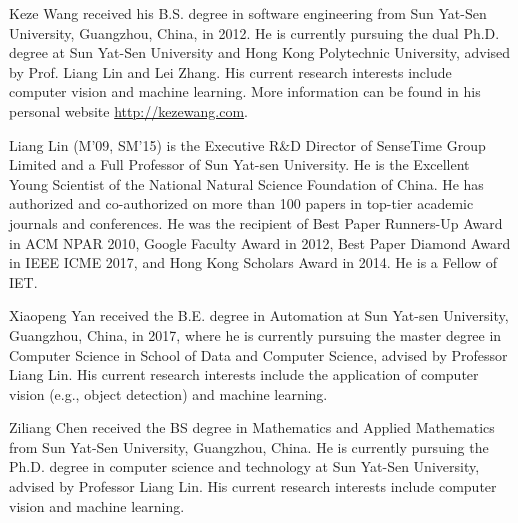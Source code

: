 \documentclass[journal]{IEEEtran}
\begin{document}
{\begin{IEEEbiography}{Keze Wang} received his B.S. degree in software engineering from Sun Yat-Sen University, Guangzhou, China, in 2012. He is currently pursuing the dual Ph.D. degree at Sun Yat-Sen University and Hong Kong Polytechnic University, advised by Prof. Liang Lin and Lei Zhang. His current research interests include computer vision and machine learning. More information can be found in his personal website \url{http://kezewang.com}.
\end{IEEEbiography}

\begin{IEEEbiography}{Liang Lin} (M’09, SM’15) is the Executive R\&D Director of SenseTime Group Limited and a Full Professor of Sun Yat-sen University. He is the Excellent Young Scientist of the National Natural Science Foundation of China. He has authorized and co-authorized on more than 100 papers in top-tier academic journals and conferences. He was the recipient of Best Paper Runners-Up Award in ACM NPAR 2010, Google Faculty Award in 2012, Best Paper Diamond Award in IEEE ICME 2017, and Hong Kong Scholars Award in 2014. He is a Fellow of IET.
\end{IEEEbiography}

\begin{IEEEbiography}{Xiaopeng Yan} received the B.E. degree in Automation at Sun Yat-sen University, Guangzhou, China, in 2017, where he is currently pursuing the master degree  in Computer Science in School of Data and Computer Science, advised by Professor Liang Lin. His current research interests include the application of computer vision (e.g., object detection) and machine learning. 
\end{IEEEbiography}


\begin{IEEEbiography}{Ziliang Chen} received the BS degree in  Mathematics and Applied Mathematics from Sun Yat-Sen University, Guangzhou, China. He is currently pursuing the Ph.D. degree in computer science and technology at Sun Yat-Sen University, advised by Professor Liang Lin. His current research interests include computer vision and machine learning.
\end{IEEEbiography}

}
\end{document}
